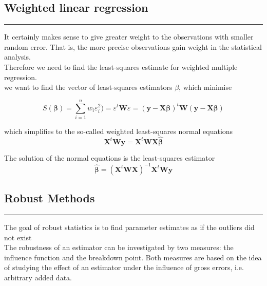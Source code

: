 \subsection{Weighted linear regression}
\noindent\rule[\linienAbstand]{\linewidth}{\linienDicke}
It certainly makes sense to give greater weight to the observations with smaller random error. That is, the more precise observations gain weight in the statistical analysis.\\
Therefore we need to find the least-squares estimate for weighted multiple regression.\\
we want to find the vector of least-squares estimators $\beta$, which minimise

\begin{equation}
  S(\mathbf{\beta}) = \sum^n_{i = 1}w_i\varepsilon^2_i) = \varepsilon^t \mathbf{W} \varepsilon =
  (\mathbf{y}-\mathbf{X}\mathbf{\beta})^t \mathbf{W}(\mathbf{y}-\mathbf{X}\mathbf{\beta})
\end{equation}

which simplifies to the so-called weighted least-squares normal equations
\begin{equation}
  \mathbf{X}^t\mathbf{Wy} = \mathbf{X}^t\mathbf{WX}\hat{\pmb{\beta}}
\end{equation}

The solution of the normal equations is the least-squares estimator
\begin{equation}
  \hat{\pmb{\beta}} = (\mathbf{X}^t\mathbf{WX})^{-1} \mathbf{X}^t\mathbf{Wy}
\end{equation}


\subsection{Robust Methods}
\noindent\rule[\linienAbstand]{\linewidth}{\linienDicke}
The goal of robust statistics is to find parameter estimates as if the outliers did not exist\\

The robustness of an estimator can be investigated by two measures: the influence function and the breakdown point. Both measures are based on the idea of studying the effect of an estimator under the influence of gross errors, i.e. arbitrary added data.

